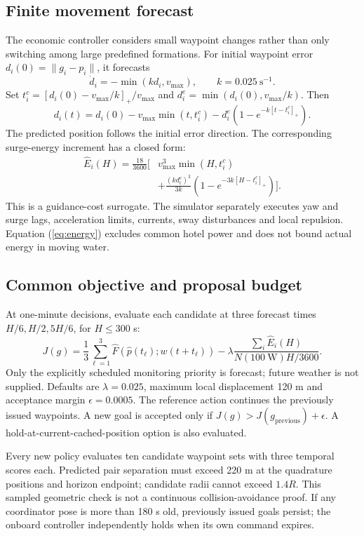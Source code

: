 \subsection{Finite movement forecast}
The economic controller considers small waypoint changes rather than only
switching among large predefined formations. For initial waypoint error
$d_i(0)=\|g_i-p_i\|$, it forecasts
\begin{equation}
 \dot d_i=-\min(kd_i,v_{\max}),\qquad k=0.025~\mathrm{s}^{-1}.
\end{equation}
Set $t_i^c=[d_i(0)-v_{\max}/k]_+/v_{\max}$ and
$d_i^e=\min(d_i(0),v_{\max}/k)$. Then
\begin{equation}
 d_i(t)=d_i(0)-v_{\max}\min(t,t_i^c)
        -d_i^e(1-e^{-k[t-t_i^c]_+}).
\end{equation}
The predicted position follows the initial error direction. The corresponding
surge-energy increment has a closed form:
\begin{align}
 \widehat E_i(H)=\frac{18}{3600}\bigg[
 &v_{\max}^3\min(H,t_i^c)\nonumber\\[-1mm]
 &+\frac{(kd_i^e)^3}{3k}
 \left(1-e^{-3k[H-t_i^c]_+}\right)\bigg].\label{eq:energy}
\end{align}
This is a guidance-cost surrogate. The simulator separately executes yaw and
surge lags, acceleration limits, currents, sway disturbances and local repulsion.
Equation (\ref{eq:energy}) excludes common hotel power and does not bound
actual energy in moving water.

\subsection{Common objective and proposal budget}
At one-minute decisions, evaluate each candidate at three forecast times
$H/6,H/2,5H/6$, for $H\leq300$ s:
\begin{equation}
 J(g)=\frac13\sum_{\ell=1}^{3}
 \widehat F(\widehat p(t_\ell);w(t+t_\ell))
 -\lambda\frac{\sum_i\widehat E_i(H)}
 {N(100~\mathrm W)H/3600}.\label{eq:J}
\end{equation}
Only the explicitly scheduled monitoring priority is forecast; future weather
is not supplied. Defaults are $\lambda=0.025$, maximum local displacement
120 m and acceptance margin $\epsilon=0.0005$.
The reference action continues the previously issued waypoints. A new goal is
accepted only if $J(g)>J(g_{\mathrm{previous}})+\epsilon$.
A hold-at-current-cached-position option is also evaluated.

Every new policy evaluates ten candidate waypoint sets with three temporal
scores each. Predicted pair separation must exceed 220 m at the quadrature
positions and horizon endpoint; candidate radii cannot exceed $1.4R$.
This sampled geometric check is not a continuous collision-avoidance proof.
If any coordinator pose is more than 180 s old, previously issued goals persist;
the onboard controller independently holds when its own command expires.

